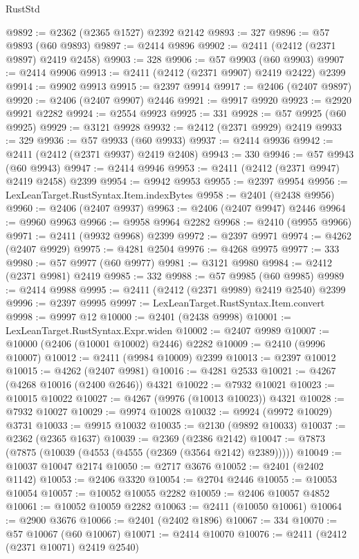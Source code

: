 \begin{lexlean}{RustStd}
\begin{coremodule}
@9892 := @2362 (@2365 @1527) @2392 @2142
@9893 := 327
@9896 := @57 @9893 (@60 @9893)
@9897 := @2414 @9896
@9902 := @2411 (@2412 (@2371 @9897) @2419 @2458)
@9903 := 328
@9906 := @57 @9903 (@60 @9903)
@9907 := @2414 @9906
@9913 := @2411 (@2412 (@2371 @9907) @2419 @2422) @2399
@9914 := @9902 @9913
@9915 := @2397 @9914
@9917 := @2406 (@2407 @9897)
@9920 := @2406 (@2407 @9907) @2446
@9921 := @9917 @9920
@9923 := @2920 @9921 @2282
@9924 := @2554 @9923
@9925 := 331
@9928 := @57 @9925 (@60 @9925)
@9929 := @3121 @9928
@9932 := @2412 (@2371 @9929) @2419
@9933 := 329
@9936 := @57 @9933 (@60 @9933)
@9937 := @2414 @9936
@9942 := @2411 (@2412 (@2371 @9937) @2419 @2408)
@9943 := 330
@9946 := @57 @9943 (@60 @9943)
@9947 := @2414 @9946
@9953 := @2411 (@2412 (@2371 @9947) @2419 @2458) @2399
@9954 := @9942 @9953
@9955 := @2397 @9954
@9956 := LexLeanTarget.RustSyntax.Item.indexBytes
@9958 := @2401 (@2438 @9956)
@9960 := @2406 (@2407 @9937)
@9963 := @2406 (@2407 @9947) @2446
@9964 := @9960 @9963
@9966 := @9958 @9964 @2282
@9968 := @2410 (@9955 @9966)
@9971 := @2411 (@9932 @9968) @2399
@9972 := @2397 @9971
@9974 := @4262 (@2407 @9929)
@9975 := @4281 @2504
@9976 := @4268 @9975
@9977 := 333
@9980 := @57 @9977 (@60 @9977)
@9981 := @3121 @9980
@9984 := @2412 (@2371 @9981) @2419
@9985 := 332
@9988 := @57 @9985 (@60 @9985)
@9989 := @2414 @9988
@9995 := @2411 (@2412 (@2371 @9989) @2419 @2540) @2399
@9996 := @2397 @9995
@9997 := LexLeanTarget.RustSyntax.Item.convert
@9998 := @9997 @12
@10000 := @2401 (@2438 @9998)
@10001 := LexLeanTarget.RustSyntax.Expr.widen
@10002 := @2407 @9989
@10007 := @10000 (@2406 (@10001 @10002) @2446) @2282
@10009 := @2410 (@9996 @10007)
@10012 := @2411 (@9984 @10009) @2399
@10013 := @2397 @10012
@10015 := @4262 (@2407 @9981)
@10016 := @4281 @2533
@10021 := @4267 (@4268 @10016 (@2400 @2646)) @4321
@10022 := @7932 @10021
@10023 := @10015 @10022
@10027 := @4267 (@9976 (@10013 @10023)) @4321
@10028 := @7932 @10027
@10029 := @9974 @10028
@10032 := @9924 (@9972 @10029) @3731
@10033 := @9915 @10032
@10035 := @2130 (@9892 @10033)
@10037 := @2362 (@2365 @1637)
@10039 := @2369 (@2386 @2142)
@10047 := @7873 (@7875 (@10039 (@4553 (@4555 (@2369 (@3564 @2142) @2389)))))
@10049 := @10037 @10047 @2174
@10050 := @2717 @3676
@10052 := @2401 (@2402 @1142)
@10053 := @2406 @3320
@10054 := @2704 @2446
@10055 := @10053 @10054
@10057 := @10052 @10055 @2282
@10059 := @2406 @10057 @4852
@10061 := @10052 @10059 @2282
@10063 := @2411 (@10050 @10061)
@10064 := @2900 @3676
@10066 := @2401 (@2402 @1896)
@10067 := 334
@10070 := @57 @10067 (@60 @10067)
@10071 := @2414 @10070
@10076 := @2411 (@2412 (@2371 @10071) @2419 @2540)

\end{coremodule}
\end{lexlean}
